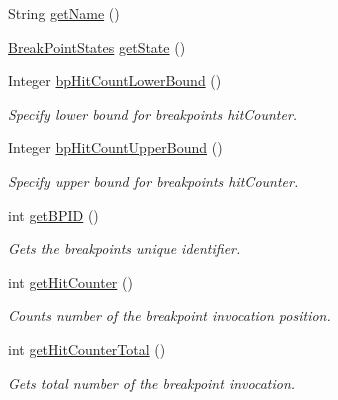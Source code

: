 \begin{DoxyCompactItemize}
\item 
String \hyperlink{interfacegov_1_1nasa_1_1jpf_1_1inspector_1_1interfaces_1_1_break_point_creation_information_a3417b55955320c81f68b2f2dc5eef7d9}{get\+Name} ()
\item 
\hyperlink{enumgov_1_1nasa_1_1jpf_1_1inspector_1_1interfaces_1_1_break_point_states}{Break\+Point\+States} \hyperlink{interfacegov_1_1nasa_1_1jpf_1_1inspector_1_1interfaces_1_1_break_point_creation_information_af471d172e5a442597709b20afe3d28e4}{get\+State} ()
\item 
Integer \hyperlink{interfacegov_1_1nasa_1_1jpf_1_1inspector_1_1interfaces_1_1_break_point_creation_information_a0732dfa7c7e94e3e28e7348a0594702b}{bp\+Hit\+Count\+Lower\+Bound} ()
\begin{DoxyCompactList}\small\item\em Specify lower bound for breakpoint\textquotesingle{}s hit\+Counter. \end{DoxyCompactList}\item 
Integer \hyperlink{interfacegov_1_1nasa_1_1jpf_1_1inspector_1_1interfaces_1_1_break_point_creation_information_a62389a60ba0878868c893d0a3d2efe56}{bp\+Hit\+Count\+Upper\+Bound} ()
\begin{DoxyCompactList}\small\item\em Specify upper bound for breakpoint\textquotesingle{}s hit\+Counter. \end{DoxyCompactList}\item 
int \hyperlink{interfacegov_1_1nasa_1_1jpf_1_1inspector_1_1interfaces_1_1_break_point_status_ae3bec2407b923c2e640eec695a9bbe64}{get\+B\+P\+ID} ()
\begin{DoxyCompactList}\small\item\em Gets the breakpoint\textquotesingle{}s unique identifier. \end{DoxyCompactList}\item 
int \hyperlink{interfacegov_1_1nasa_1_1jpf_1_1inspector_1_1interfaces_1_1_break_point_status_aa58761be50e0e0ecb7d6a7fb3ded8bf9}{get\+Hit\+Counter} ()
\begin{DoxyCompactList}\small\item\em Counts number of the breakpoint invocation position. \end{DoxyCompactList}\item 
int \hyperlink{interfacegov_1_1nasa_1_1jpf_1_1inspector_1_1interfaces_1_1_break_point_status_abdf0e6a13c2758d552a9d74f1dbc33e2}{get\+Hit\+Counter\+Total} ()
\begin{DoxyCompactList}\small\item\em Gets total number of the breakpoint invocation. \end{DoxyCompactList}\item 

\end{DoxyCompactItemize}
